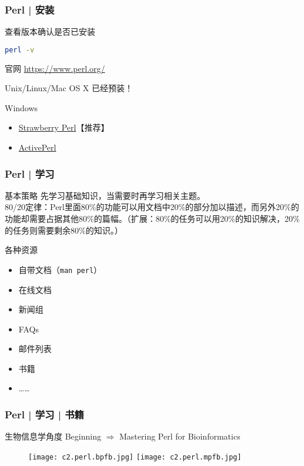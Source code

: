 \begin{frame}[fragile]
  \frametitle{Perl | 安装}
  \begin{block}{查看版本确认是否已安装}
\begin{lstlisting}[language=bash]
perl -v
\end{lstlisting}
  \end{block}
  \pause
  \begin{block}{官网}
    \href{https://www.perl.org/}{https://www.perl.org/}
  \end{block}
  \pause
  \begin{block}{Unix/Linux/Mac OS X}
    已经预装！
  \end{block}
  \pause
  \begin{block}{Windows}
    \begin{itemize}
      \item \href{http://strawberryperl.com/}{Strawberry Perl}【推荐】
      \item \href{http://www.activestate.com/activeperl/downloads}{ActivePerl}
    \end{itemize}
  \end{block}
\end{frame}

\begin{frame}[fragile]
  \frametitle{Perl | 学习}
  \begin{block}{基本策略}
    先学习基础知识，当需要时再学习相关主题。\\
    80/20定律：Perl里面80\%的功能可以用文档中20\%的部分加以描述，而另外20\%的功能却需要占据其他80\%的篇幅。（扩展：80\%的任务可以用20\%的知识解决，20\%的任务则需要剩余80\%的知识。）
  \end{block}
  \pause
  \begin{block}{各种资源}
    \begin{itemize}
      \item 自带文档（\verb|man perl|）
      \item 在线文档
      \item 新闻组
      \item FAQs
      \item 邮件列表
      \item 书籍
      \item ……
    \end{itemize}
  \end{block}
\end{frame}

\begin{frame}
  \frametitle{Perl | 学习 | 书籍}
  \begin{block}{生物信息学角度}
Beginning $\Longrightarrow$ Mastering Perl for Bioinformatics
  \end{block}
  \begin{figure}
    \centering
    \texttt{[image: c2.perl.bpfb.jpg]}
    \hspace{1em}
    \texttt{[image: c2.perl.mpfb.jpg]}
  \end{figure}
\end{frame}

